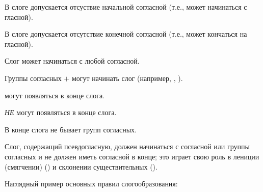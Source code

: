 \begin{itemize*}
  \item В слоге допускается отсуствие начальной согласной (т.е., может начинаться с глас\-ной).
  \item В слоге допускается отсутствие конечной согласной (т.е., может кончаться на глас\-ной).
  \item Слог может начинаться с любой согласной.
  \item Группы согласных  $+$  могут начинать слог (например, , ).
  \item {} могут появляться в конце слога.
  \item {}  \textit{НЕ} могут появляться в конце слога.
  \item В конце слога не бывает групп согласных.
  \item \label{l-and-s:pseudo-no-null} Слог, содержащий псевдогласную, должен начинаться с согласной или груп\-пы со\-глас\-ных и не дол\-жен иметь со\-глас\-ной в конце; это играет свою роль в лениции (смягчении)
    () и склонении существительных
    ().
\end{itemize*}

\newpage
\noindent Наглядный пример основных правил слогообразования:


